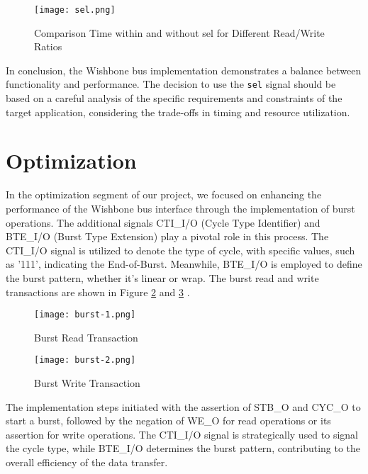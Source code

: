 \documentclass[conference]{IEEEtran}
\begin{document}
\begin{figure}[h] 
    \centering
    \texttt{[image: sel.png]}
    \caption{Comparison Time within and without sel for Different Read/Write Ratios}
    \label{sel}
\end{figure}



In conclusion, the Wishbone bus implementation demonstrates a balance between functionality and performance. The decision to use the \texttt{sel} signal should be based on a careful analysis of the specific requirements and constraints of the target application, considering the trade-offs in timing and resource utilization.



\section{Optimization}
In the optimization segment of our project, we focused on enhancing the performance of the Wishbone bus interface through the implementation of burst operations. The additional signals CTI\_I/O (Cycle Type Identifier) and BTE\_I/O (Burst Type Extension) play a pivotal role in this process. The CTI\_I/O signal is utilized to denote the type of cycle, with specific values, such as '111', indicating the End-of-Burst. Meanwhile, BTE\_I/O is employed to define the burst pattern, whether it's linear or wrap. The burst read and write transactions are shown in Figure \ref{Burst Read Transaction} and \ref{Burst Write Transaction} \cite{csdn84531533}.

\begin{figure}[h]
    \centering
    \texttt{[image: burst-1.png]}
    \caption{Burst Read Transaction}
    \label{Burst Read Transaction}
\end{figure}

\begin{figure}[h]
    \centering
    \texttt{[image: burst-2.png]}
    \caption{Burst Write Transaction}
    \label{Burst Write Transaction}
\end{figure}

The implementation steps initiated with the assertion of STB\_O and CYC\_O to start a burst, followed by the negation of WE\_O for read operations or its assertion for write operations. The CTI\_I/O signal is strategically used to signal the cycle type, while BTE\_I/O determines the burst pattern, contributing to the overall efficiency of the data transfer.
\end{document}
